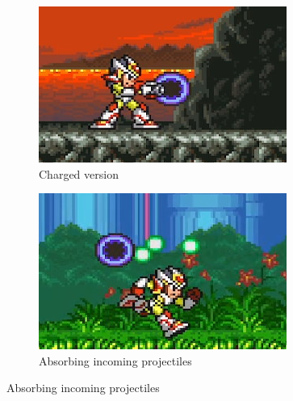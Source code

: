 \begin{figure}[htp]
	\ContinuedFloat
	\centering
	\begin{subfigure}[t]{0.4\linewidth}
		\centering
		\includegraphics[width=\linewidth]{figures/X2/weapons/M_mine_3.png}	
		\caption{Charged version}
	\end{subfigure}
	\begin{subfigure}[t]{0.4\linewidth}
		\centering
		\includegraphics[width=\linewidth]{figures/X2/weapons/M_mine_4.png}	
		\caption{Absorbing incoming projectiles}
	\end{subfigure}
\end{figure}
